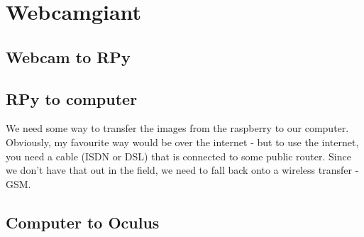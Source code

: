 

\section{Webcamgiant}

\subsection{Webcam to RPy}

\subsection{RPy to computer}

We need some way to transfer the images from the raspberry to our computer. Obviously, my favourite way would be over the internet - but to use the internet, you need a cable (ISDN or DSL) that is connected to some public router. Since we don't have that out in the field, we need to fall back onto a wireless transfer - GSM. 

\subsection{Computer to Oculus}